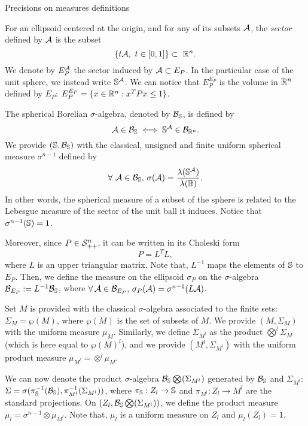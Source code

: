 \begin{section}{Precisions on measures definitions}

For an ellipsoid centered at the origin, and for any of its subsets $\mathcal{A}$, the \emph{sector} defined by $\mathcal{A}$ is the subset $$\{t \calA, \ t \in [0,1]\} \subset\ \R^n.$$ We denote by $E_P^{\mathcal{A}}$ the sector induced by $\mathcal{A} \subset E_P$. In the particular case of the unit sphere, we instead write $\mathbb{S}^{\mathcal{A}}$. We can notice that $E_P^{E_P}$ is the volume in $\mathbb{R}^n$ defined by $E_P$: $E_P^{E_P} = \{x \in \mathbb{R}^n: x^TPx \leq 1\}$.

The spherical Borelian $\sigma$-algebra, denoted by $\mathcal{B}_{\mathbb{S}}$, is defined by $$\mathcal{A} \in \mathcal{B}_{\mathbb{S}} \iff \mathbb{S}^{\mathcal{A}} \in \mathcal{B}_{\mathbb{R}^n}.$$ We provide $(\mathbb{S},\mathcal{B}_{\mathbb{S}})$ with the classical, unsigned and finite uniform spherical measure $\sigma^{n-1}$ defined by
$$\forall\ \mathcal{A} \in \mathcal{B}_{\mathbb{S}},\, \sigma(\mathcal{A}) = \frac{\lambda(\mathbb{S}^{\mathcal{A}})}{\lambda(\mathbb{B})}. $$
In other words, the spherical measure of a subset of the sphere is related to the Lebesgue measure of the sector of the unit ball it induces. Notice that $\sigma^{n-1}(\mathbb{S}) = 1$.

Moreover, since $P \in \mathcal{S}_{++}^n$, it can be written in its Choleski form \begin{equation}\label{choleski}P = L^TL,\end{equation} where $L$ is an upper triangular matrix. Note that, $L^{-1}$ maps the elements of $\mathbb{S}$ to $E_P$. Then, we define the measure on the ellipsoid $\sigma_P$ on the $\sigma$-algebra $\mathcal{B}_{E_P}:=L^{-1}\mathcal{B}_{\mathbb{S}}$, where $\forall\, \mathcal{A} \in \mathcal{B}_{E_P},\, \sigma_P({\mathcal{A}}) = \sigma^{n-1}(L\mathcal{A})$. 

Set $M$ is provided with the classical $\sigma$-algebra associated to the finite sets: $\Sigma_M = \wp(M)$, where $\wp(M)$ is the set of subsets of $M$. We provide $(M, \Sigma_M)$ with the uniform measure $\mu_M$. Similarly, we define $\Sigma_{M^l}$ as the product $\bigotimes^l \Sigma_M$ (which is here equal to $\wp(M)^l$), and we provide $(M^l, \Sigma_{M^l})$ with the uniform product measure $\mu_{M^l} = \otimes^l \mu_M$.

We can now denote the product $\sigma$-algebra $\mathcal{B}_{\mathbb{S}} \bigotimes (\Sigma_{M^l})$ generated by $\mathcal{B}_{\mathbb{S}}$ and $\Sigma_{M^l}$: $\Sigma = \sigma( \pi_{\mathbb{S}}^{-1}(\mathcal{B}_{\mathbb{S}}),  \pi_{M^l}^{-1}(\Sigma_{M^l}))$, where $\pi_{\mathbb{S}}: Z_l \to \mathbb{S}$ and $\pi_{M^l}: Z_l \to M^l$ are the standard projections. On $(Z_l,\mathcal{B}_{\mathbb{S}} \bigotimes (\Sigma_{M^l}) )$, we define the product measure $\mu_l = \sigma^{n-1} \otimes \mu_{M^l}$. Note that, $\mu_l$ is a uniform measure on $Z_l$ and $\mu_l(Z_l)=1$.  

\end{section}